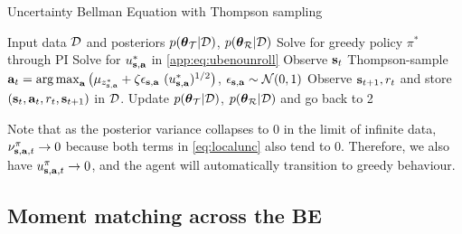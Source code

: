 \documentclass{article}
\begin{document}
\begin{appendices}
\begin{algorithm}
  \caption{Uncertainty Bellman Equation with Thompson sampling}
  \begin{algorithmic}[1]\label{ube:algo}
\State Input data $\mathcal{D}$ and posteriors $p(\boldsymbol{\theta}_{\mathcal{T}} | \mathcal{D})$, $p(\boldsymbol{\theta}_{\mathcal{R}} | \mathcal{D})$
\State Solve for greedy policy ${\pi^*}$ through PI
\State Solve for $u_{\mathbf{s}, \mathbf{a}}^*$ in \cref{app:eq:ubenounroll}
 	\State Observe $\mathbf{s}_t$
	\State Thompson-sample $\mathbf{a}_t = \operatorname*{arg\,max}_{\mathbf{a}} \big(\mu_{z^*_{\mathbf{s}, \mathbf{a}}} + \zeta \epsilon_{\mathbf{s}, \mathbf{a}}~(u_{\mathbf{s}, \mathbf{a}}^*)^{1/2}\big)$, $\epsilon_{\mathbf{s}, \mathbf{a}} \sim \mathcal{N}(0, 1)$
	\State Observe $\mathbf{s}_{t+1}, r_{t}$ and store $(\mathbf{s}_{t}, \mathbf{a}_t, r_{t}, \mathbf{s}_{t+1})$ in $\mathcal{D}$.
\EndFor
\State Update $p(\boldsymbol{\theta}_{\mathcal{T}} | \mathcal{D})$, $p(\boldsymbol{\theta}_{\mathcal{R}} | \mathcal{D})$ and go back to 2
\end{algorithmic}
\end{algorithm}

\noindent Note that as the posterior variance collapses to 0 in the limit of infinite data, $\nu^{\pi}_{\mathbf{s}, \mathbf{a}, t} \to 0$ because both terms in \cref{eq:localunc} also tend to 0. Therefore, we also have $u_{\mathbf{s}, \mathbf{a}, t}^\pi \to 0$, and the agent will automatically transition to greedy behaviour.

\subsection{Moment matching across the BE}\label{app:mm}


\end{appendices}
\end{document}
